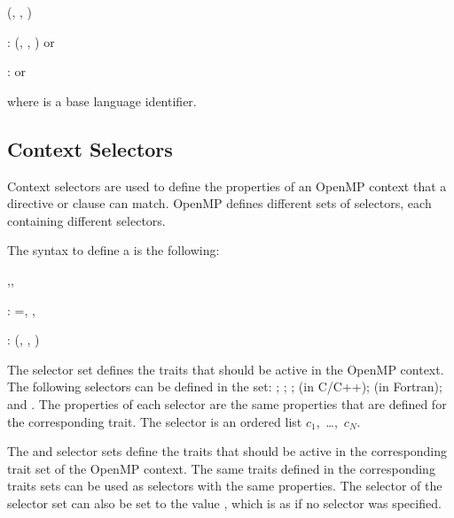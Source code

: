 \begin{ompSyntax}
\plc{identifier[}(\plc{context-element[}, \plc{context-element[}, \plc{...]]})\plc{]}

:
  \plc{identifier[}(\plc{context-element[}, \plc{context-element[}, \plc{...]]})\plc{]}
  or

:
  or
\end{ompSyntax}

where  is a base language identifier.

\subsection{Context Selectors}
\label{subsec:Context Selectors}

Context selectors are used to define the properties of an OpenMP context that
a directive or clause can match. OpenMP defines different sets of selectors, 
each containing different selectors.

The syntax to define a  is the following:

\begin{ompSyntax}
\plc{trait-set-selector[},\plc{trait-set-selector[},\plc{...]]}

:
   ={\plc{trait-selector[}, \plc{trait-selector[}, \plc{...]]}}

:
   \plc{trait-selector-name[}(\plc{trait-property[}, \plc{trait-property[}, \plc{...]]})\plc{]}
\end{ompSyntax}

The  selector set defines the  traits that should
be active in the OpenMP context. The following selectors can be defined in the
 set: ; ; ; 
(in C/C++);  (in Fortran); and . The properties of each
selector are the same properties that are defined for the corresponding trait.
The  selector is an ordered list $c_{1}$,~\ldots,~$c_{N}$.

The  and  selector sets define the traits that
should be active in the corresponding trait set of the OpenMP context. The
same traits defined in the corresponding traits sets can be used as selectors
with the same properties. The  selector of the 
selector set can also be set to the value , which is as if no
 selector was specified.

